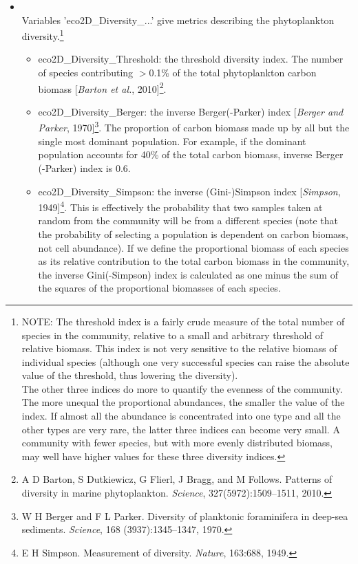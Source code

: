 \begin{itemize}[noitemsep]
\item[\textbf{Diversity metrics}] \
\\Variables  '\textsf{\footnotesize eco2D\_Diversity\_...}' give metrics describing the {phytoplankton} diversity.\footnote{NOTE: The threshold index is a fairly crude measure of the total number of species in the community, relative to a small and arbitrary threshold of relative biomass. This index is not very sensitive to the relative biomass of individual species (although one very successful species can raise the absolute value of the threshold, thus lowering the diversity).
\\The other three indices do more to quantify the evenness of the community. The more unequal the proportional abundances, the smaller the value of the index. If almost all the abundance is concentrated into one type and all the other types are very rare, the latter three indices can become very small. A community with fewer species, but with more evenly distributed biomass, may well have higher values for these three diversity indices.}
\vspace{1mm}
\begin{itemize}[noitemsep]
\item \textsf{\footnotesize eco2D\_Diversity\_Threshold}: the threshold diversity index. The number of species contributing $>$0.1\% of the total phytoplankton carbon biomass [\textit{Barton et al.}, 2010]\footnote{A D Barton, S Dutkiewicz, G Flierl, J Bragg, and M Follows. Patterns of diversity in marine phytoplankton. \textit{Science}, 327(5972):1509–1511, 2010.}.
\item \textsf{\footnotesize eco2D\_Diversity\_Berger}: the inverse Berger(-Parker) index  [\textit{Berger and Parker}, 1970]\footnote{W H Berger and F L Parker. Diversity of planktonic foraminifera in deep-sea sediments. \textit{Science}, 168 (3937):1345–1347, 1970.}. The proportion of carbon biomass made up by all but the single most dominant population. For example, if the dominant population accounts for 40\% of the total carbon biomass, inverse Berger (-Parker) index is 0.6.
\item \textsf{\footnotesize eco2D\_Diversity\_Simpson}: the inverse (Gini-)Simpson index [\textit{Simpson}, 1949]\footnote{E H Simpson. Measurement of diversity. \textit{Nature}, 163:688, 1949.}. This is effectively the probability that two samples taken at random from the community will be from a different species (note that the probability of selecting a population is dependent on carbon biomass, not cell abundance). If we define the proportional biomass of each species as its relative contribution to the total carbon biomass in the community, the inverse Gini(-Simpson) index is calculated as one minus the sum of the squares of the proportional biomasses of each species.

\end{itemize}
\end{itemize}
